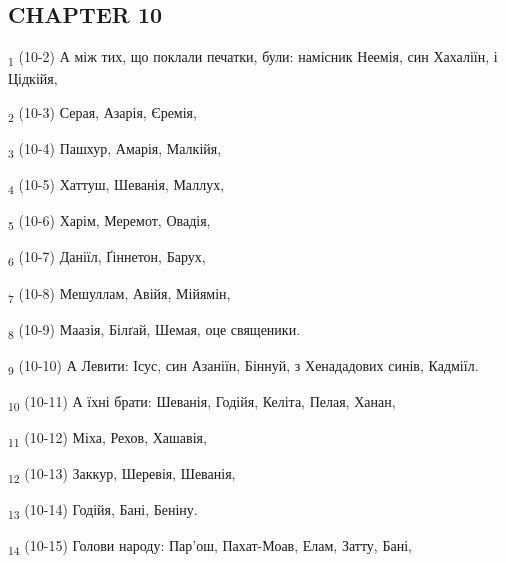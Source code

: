 \subsection{CHAPTER 10}
\begin{tcolorbox}
\textsubscript{1} (10-2) А між тих, що поклали печатки, були: намісник Неемія, син Хахаліїн, і Цідкійя,
\end{tcolorbox}
\begin{tcolorbox}
\textsubscript{2} (10-3) Серая, Азарія, Єремія,
\end{tcolorbox}
\begin{tcolorbox}
\textsubscript{3} (10-4) Пашхур, Амарія, Малкійя,
\end{tcolorbox}
\begin{tcolorbox}
\textsubscript{4} (10-5) Хаттуш, Шеванія, Маллух,
\end{tcolorbox}
\begin{tcolorbox}
\textsubscript{5} (10-6) Харім, Меремот, Овадія,
\end{tcolorbox}
\begin{tcolorbox}
\textsubscript{6} (10-7) Даніїл, Ґіннетон, Барух,
\end{tcolorbox}
\begin{tcolorbox}
\textsubscript{7} (10-8) Мешуллам, Авійя, Мійямін,
\end{tcolorbox}
\begin{tcolorbox}
\textsubscript{8} (10-9) Маазія, Білґай, Шемая, оце священики.
\end{tcolorbox}
\begin{tcolorbox}
\textsubscript{9} (10-10) А Левити: Ісус, син Азаніїн, Біннуй, з Хенададових синів, Кадміїл.
\end{tcolorbox}
\begin{tcolorbox}
\textsubscript{10} (10-11) А їхні брати: Шеванія, Годійя, Келіта, Пелая, Ханан,
\end{tcolorbox}
\begin{tcolorbox}
\textsubscript{11} (10-12) Міха, Рехов, Хашавія,
\end{tcolorbox}
\begin{tcolorbox}
\textsubscript{12} (10-13) Заккур, Шеревія, Шеванія,
\end{tcolorbox}
\begin{tcolorbox}
\textsubscript{13} (10-14) Годійя, Бані, Беніну.
\end{tcolorbox}
\begin{tcolorbox}
\textsubscript{14} (10-15) Голови народу: Пар'ош, Пахат-Моав, Елам, Затту, Бані,
\end{tcolorbox}
